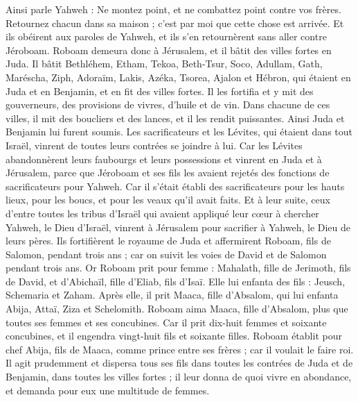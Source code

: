 \begin{multicols}{2}
Ainsi parle Yahweh : Ne montez point, et ne combattez point contre vos frères. Retournez chacun dans sa maison ; c'est par moi que cette chose est arrivée. Et ils obéirent aux paroles de Yahweh, et ils s'en retournèrent sans aller contre Jéroboam.
Roboam demeura donc à Jérusalem, et il bâtit des villes fortes en Juda.
Il bâtit Bethléhem, Etham, Tekoa,
Beth-Tsur, Soco, Adullam,
Gath, Maréscha, Ziph,
Adoraïm, Lakis, Azéka,
Tsorea, Ajalon et Hébron, qui étaient en Juda et en Benjamin, et en fit des villes fortes.
Il les fortifia et y mit des gouverneurs, des provisions de vivres, d'huile et de vin.
Dans chacune de ces villes, il mit des boucliers et des lances, et il les rendit puissantes. Ainsi Juda et Benjamin lui furent soumis.
Les sacrificateurs et les Lévites, qui étaient dans tout Israël, vinrent de toutes leurs contrées se joindre à lui.
Car les Lévites abandonnèrent leurs faubourgs et leurs possessions et vinrent en Juda et à Jérusalem, parce que Jéroboam et ses fils les avaient rejetés des fonctions de sacrificateurs pour Yahweh.
Car il s'était établi des sacrificateurs pour les hauts lieux, pour les boucs, et pour les veaux qu'il avait faits.
Et à leur suite, ceux d'entre toutes les tribus d'Israël qui avaient appliqué leur cœur à chercher Yahweh, le Dieu d'Israël, vinrent à Jérusalem pour sacrifier à Yahweh, le Dieu de leurs pères.
Ils fortifièrent le royaume de Juda et affermirent Roboam, fils de Salomon, pendant trois ans ; car on suivit les voies de David et de Salomon pendant trois ans.
Or Roboam prit pour femme : Mahalath, fille de Jerimoth, fils de David, et d'Abichaïl, fille d'Eliab, fils d'Isaï.
Elle lui enfanta des fils : Jeusch, Schemaria et Zaham.
Après elle, il prit Maaca, fille d'Absalom, qui lui enfanta Abija, Attaï, Ziza et Schelomith.
Roboam aima Maaca, fille d'Absalom, plus que toutes ses femmes et ses concubines. Car il prit dix-huit femmes et soixante concubines, et il engendra vingt-huit fils et soixante filles.
Roboam établit pour chef Abija, fils de Maaca, comme prince entre ses frères ; car il voulait le faire roi.
Il agit prudemment et dispersa tous ses fils dans toutes les contrées de Juda et de Benjamin, dans toutes les villes fortes ; il leur donna de quoi vivre en abondance, et demanda pour eux une multitude de femmes.

\end{multicols}
